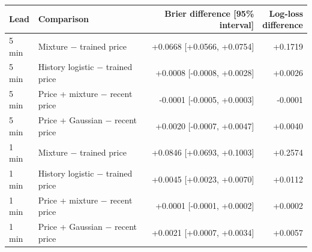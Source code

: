 \begin{tabular}{llrr}
\toprule
Lead & Comparison & Brier difference [95\% interval] & \shortstack{Log-loss\\difference} \\
\midrule
5 min & Mixture $-$ trained price & +0.0668 [+0.0566, +0.0754] & +0.1719 \\
5 min & History logistic $-$ trained price & +0.0008 [-0.0008, +0.0028] & +0.0026 \\
5 min & Price + mixture $-$ recent price & -0.0001 [-0.0005, +0.0003] & -0.0001 \\
5 min & Price + Gaussian $-$ recent price & +0.0020 [-0.0007, +0.0047] & +0.0040 \\
1 min & Mixture $-$ trained price & +0.0846 [+0.0693, +0.1003] & +0.2574 \\
1 min & History logistic $-$ trained price & +0.0045 [+0.0023, +0.0070] & +0.0112 \\
1 min & Price + mixture $-$ recent price & +0.0001 [-0.0001, +0.0002] & +0.0002 \\
1 min & Price + Gaussian $-$ recent price & +0.0021 [+0.0007, +0.0034] & +0.0057 \\
\bottomrule
\end{tabular}
